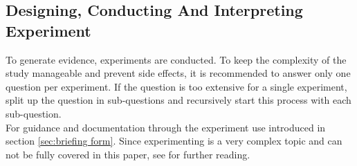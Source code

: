 
\subsection{Designing, Conducting And Interpreting Experiment}
\label{subsec:designing conducting and interpreting experiment}
To generate evidence, experiments are conducted. To keep the complexity of the study manageable and prevent side effects, it is recommended to answer only one question per experiment. If the question is too extensive for a single experiment, split up the question in sub-questions and recursively start this process with each sub-question.\\
For guidance and documentation through the experiment use \briefingform introduced in section \ref{sec:briefing form}. Since experimenting is a very complex topic and can not be fully covered in this paper, see \cite{Wohlin2012,Tullis2013} for further reading.
